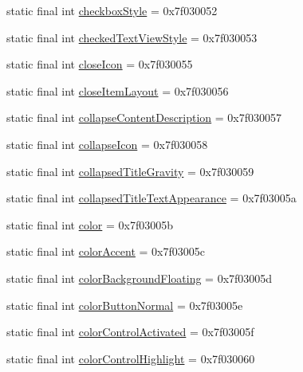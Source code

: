 \begin{DoxyCompactItemize}
static final int \mbox{\hyperlink{classandroid_1_1support_1_1design_1_1R_1_1attr_abac68647b3bf87f91a6a8797daa07430}{checkbox\+Style}} = 0x7f030052
\item 
static final int \mbox{\hyperlink{classandroid_1_1support_1_1design_1_1R_1_1attr_a46619b29955b955344296891b92bfc16}{checked\+Text\+View\+Style}} = 0x7f030053
\item 
static final int \mbox{\hyperlink{classandroid_1_1support_1_1design_1_1R_1_1attr_ab8fd66b58592da0068302a1f8a189f7c}{close\+Icon}} = 0x7f030055
\item 
static final int \mbox{\hyperlink{classandroid_1_1support_1_1design_1_1R_1_1attr_afe89b1d611a683ea18f85ffdb515f2e0}{close\+Item\+Layout}} = 0x7f030056
\item 
static final int \mbox{\hyperlink{classandroid_1_1support_1_1design_1_1R_1_1attr_a215609776fda25e73da2d429d4e8310f}{collapse\+Content\+Description}} = 0x7f030057
\item 
static final int \mbox{\hyperlink{classandroid_1_1support_1_1design_1_1R_1_1attr_a8f6c4abc219435477139c0be490cc35c}{collapse\+Icon}} = 0x7f030058
\item 
static final int \mbox{\hyperlink{classandroid_1_1support_1_1design_1_1R_1_1attr_a2f6e7d8594fc1d351255f9c547a25e5e}{collapsed\+Title\+Gravity}} = 0x7f030059
\item 
static final int \mbox{\hyperlink{classandroid_1_1support_1_1design_1_1R_1_1attr_a4d0eb85ec9562313f00d4af6c9ed6b73}{collapsed\+Title\+Text\+Appearance}} = 0x7f03005a
\item 
static final int \mbox{\hyperlink{classandroid_1_1support_1_1design_1_1R_1_1attr_ab11a93bf8eba02b9dcc4fd0f690cbc73}{color}} = 0x7f03005b
\item 
static final int \mbox{\hyperlink{classandroid_1_1support_1_1design_1_1R_1_1attr_a15e1522787f101529fbfb34e6839a47e}{color\+Accent}} = 0x7f03005c
\item 
static final int \mbox{\hyperlink{classandroid_1_1support_1_1design_1_1R_1_1attr_a1015287b07505c4a3bfd0b74f81c26ad}{color\+Background\+Floating}} = 0x7f03005d
\item 
static final int \mbox{\hyperlink{classandroid_1_1support_1_1design_1_1R_1_1attr_af13a0f02cf3973a6702c3aed33502dca}{color\+Button\+Normal}} = 0x7f03005e
\item 
static final int \mbox{\hyperlink{classandroid_1_1support_1_1design_1_1R_1_1attr_afe306e82da2093e0461e14011062f6d0}{color\+Control\+Activated}} = 0x7f03005f
\item 
static final int \mbox{\hyperlink{classandroid_1_1support_1_1design_1_1R_1_1attr_a9b9ac1ed1cd6476e66fbf585519be242}{color\+Control\+Highlight}} = 0x7f030060

\end{DoxyCompactItemize}
